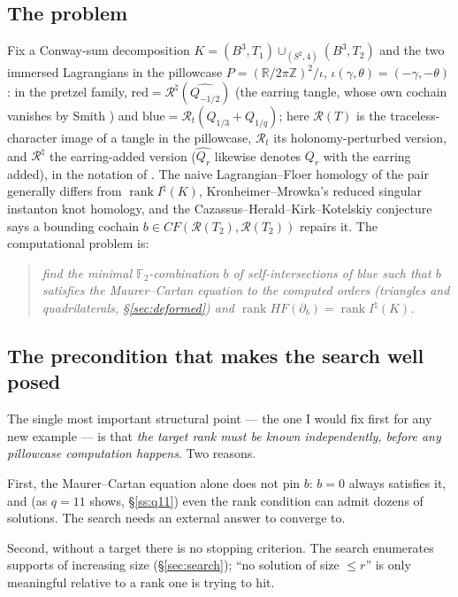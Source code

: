 \documentclass[11pt,reqno]{amsart}
\theoremstyle{plain}
\theoremstyle{definition}
\newcommand{\R}{\mathbb{R}}
\newcommand{\Z}{\mathbb{Z}}
\newcommand{\F}{\mathbb{F}}
\newcommand{\Inat}{I^{\natural}}
\newcommand{\HF}{\mathit{HF}}
\newcommand{\CF}{\mathit{CF}}
\newcommand{\rk}{\operatorname{rank}}
\newcommand{\pill}{P}
\newcommand{\Rnat}{\mathcal{R}^{\natural}}
\newcommand{\Rp}{\mathcal{R}}
\newcommand{\bc}{b}
\newcommand{\Qh}[1]{\widehat{Q_{#1}}}
\begin{document}
\subsection{The problem}
Fix a Conway-sum decomposition $K=(B^3,T_1)\cup_{(S^2,4)}(B^3,T_2)$ and the two immersed
Lagrangians in the pillowcase $\pill=(\R/2\pi\Z)^2/\iota$, $\iota(\gamma,\theta)=(-\gamma,-\theta)$:
in the pretzel family, $\mathrm{red}=\Rnat(\Qh{-1/2})$ (the earring tangle, whose own cochain
vanishes by Smith \cite[Lemma~5.6]{Smi}) and $\mathrm{blue}=\Rp_t(Q_{1/3}+Q_{1/q})$; here
$\Rp(T)$ is the traceless-character image of a tangle in the pillowcase, $\Rp_t$ its
holonomy-perturbed version, and $\Rnat$ the earring-added version ($\Qh{r}$ likewise denotes
$Q_r$ with the earring added), in the notation of \cite{P2}. The naive Lagrangian--Floer homology of the pair generally differs from
$\rk\Inat(K)$, Kronheimer--Mrowka's reduced singular instanton knot homology, and the
Cazassus--Herald--Kirk--Kotelskiy conjecture \cite{CHKK} says a bounding cochain
$\bc\in\CF(\Rp(T_2),\Rp(T_2))$ repairs it. The computational problem is:
\begin{quote}
\emph{find the minimal $\F_2$-combination $\bc$ of self-intersections of blue such that
$\bc$ satisfies the Maurer--Cartan equation to the computed orders (triangles and
quadrilaterals, \S\ref{sec:deformed}) and
$\rk\HF(\partial_\bc)=\rk\Inat(K)$.}
\end{quote}

\subsection{The precondition that makes the search well posed}\label{ss:precondition}
The single most important structural point --- the one I would fix first for any new example ---
is that \emph{the target rank must be known independently, before any pillowcase computation
happens}. Two reasons.

First, the Maurer--Cartan equation alone does not pin $\bc$: $\bc=0$ always satisfies it, and
(as $q=11$ shows, \S\ref{ss:q11}) even the rank condition can admit dozens of solutions. The
search needs an external answer to converge to.

Second, without a target there is no stopping criterion. The search enumerates supports of
increasing size (\S\ref{sec:search}); ``no solution of size $\le r$'' is only meaningful
relative to a rank one is trying to hit.
\end{document}
